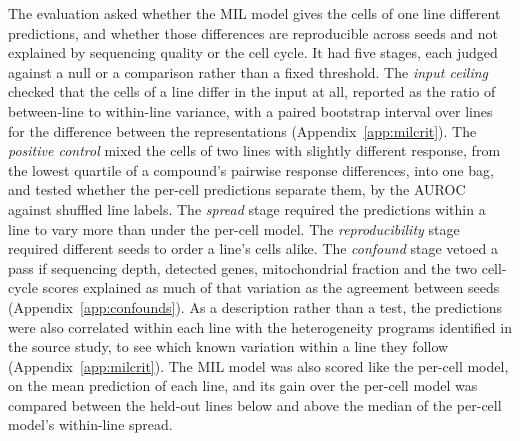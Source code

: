 The evaluation asked whether the MIL model gives the cells of one line different predictions, and whether
those differences are reproducible across seeds and not explained by sequencing quality or the cell cycle.
It had five stages, each judged against a null or a comparison rather than a fixed threshold. The
\emph{input ceiling} checked that the cells of a line differ in the input at all, reported as the ratio
of between-line to within-line variance, with a paired bootstrap interval over lines for the
difference between the representations (Appendix~\ref{app:milcrit}). The \emph{positive control} mixed the cells of two lines with
slightly different response, from the lowest quartile of a compound's pairwise response differences,
into one bag, and tested whether the per-cell predictions separate them, by the AUROC against shuffled
line labels. The \emph{spread} stage required the predictions within a
line to vary more than under the per-cell model. The \emph{reproducibility} stage required different
seeds to order a line's cells alike. The \emph{confound} stage vetoed a pass if sequencing depth,
detected genes, mitochondrial fraction and the two cell-cycle scores \cite{scp542} explained as much of
that variation as the agreement between seeds (Appendix~\ref{app:confounds}). As a description rather than a
test, the predictions were also correlated within each line with the heterogeneity programs identified in
the source study, to see which known variation within a line they follow (Appendix~\ref{app:milcrit}).
The MIL model was also scored like the per-cell model, on the mean prediction of each line, and its gain
over the per-cell model was compared between the held-out lines below and above the median of the
per-cell model's within-line spread.
